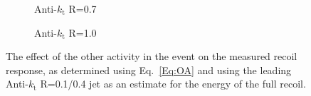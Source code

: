 \begin{figure}[!ht]
  \centering
  \begin{subfigure}{.5\textwidth}
    \centering
    \caption{Anti-$k_\mathrm{t}$ R=0.7}
  \end{subfigure}%
  \begin{subfigure}{.5\textwidth}  \centering
    \caption{Anti-$k_\mathrm{t}$ R=1.0}
  \end{subfigure}
  \caption{The effect of the other activity in the event on the measured recoil response, as determined using Eq.~\ref{Eq:OA} and using the leading Anti-$k_\mathrm{t}$ R=0.1/0.4 jet as an estimate for the energy of the full recoil.  }
  \label{Fig:OA_7-10}
\end{figure}

